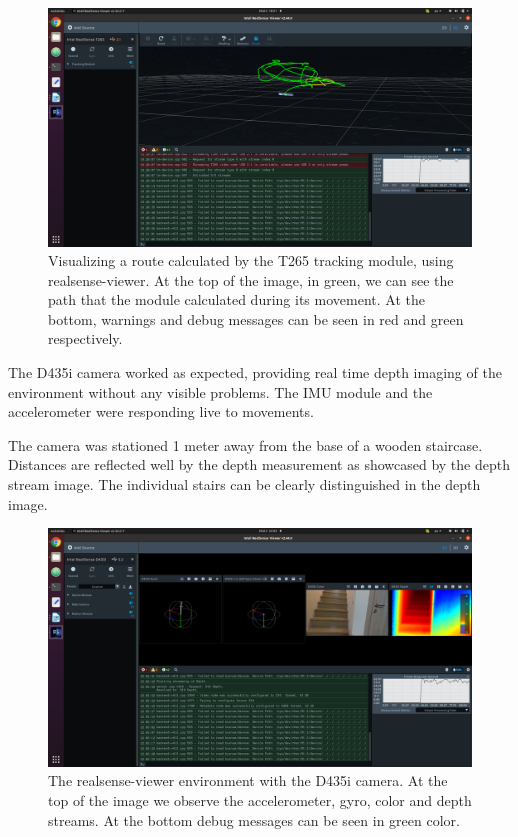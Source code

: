 \documentclass{article}
\begin{document}
\begin{figure}[h] %
	\centering
	\includegraphics[width=1\columnwidth]{report1-img005.png} %
	\caption{Visualizing a route calculated by the T265 tracking module, using realsense-viewer.  At the top of the image, in green, we can see the path that the module calculated during its movement. At the bottom, warnings and debug messages can be seen in red and green respectively.}
\end{figure}


The D435i camera worked as expected, providing real time depth imaging of the environment without any visible problems. The IMU module and the accelerometer were responding live to movements.

The camera was stationed 1 meter away from the base of a wooden staircase. Distances are reflected well by the depth measurement as showcased by the depth stream image. The individual stairs can be clearly distinguished in the depth image.

\begin{figure}[h] %
    \centering
	\includegraphics[width=\textwidth,height=\textheight,keepaspectratio]{report1-img006.png} %
	\caption{The realsense-viewer environment with the D435i camera. At the top of the image we observe the accelerometer, gyro, color and depth streams. At the bottom debug messages can be seen in green color.}
\end{figure}
\end{document}
